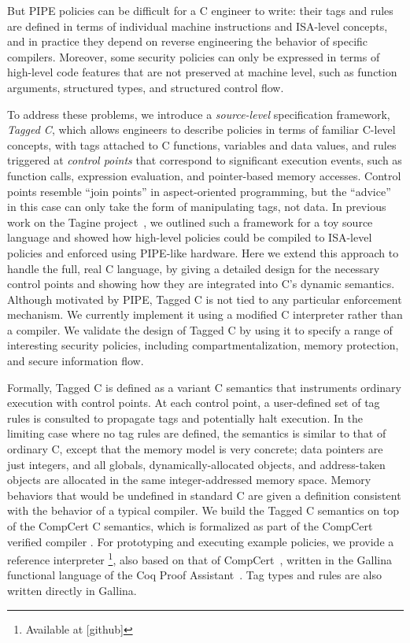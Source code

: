 \documentclass{llncs}
\begin{document}
But PIPE policies can be difficult for a C engineer to write: their tags and rules
are defined in terms of individual machine instructions and ISA-level
concepts, and in practice they depend on reverse engineering the behavior
of specific compilers. 
Moreover, some security policies can only be expressed in terms of high-level code
features that are not preserved at machine level, such as function
arguments, structured types, and structured control flow.

To address these problems, we introduce a \emph{source-level} specification framework, \emph{Tagged C},
which allows engineers to describe policies in terms of familiar C-level concepts, with tags attached
to C functions, variables and data values, and rules triggered at \emph{control points} that
correspond to significant execution events, such as function calls, expression evaluation,
and pointer-based memory accesses. 
Control points resemble ``join points'' in aspect-oriented programming, but the ``advice''
in this case can only take the form of manipulating tags, not data.
In previous work on the Tagine project~\cite{Chhak21:Tagine}, we outlined such a framework for a toy
source language and showed how high-level policies could be compiled to ISA-level policies and 
enforced using PIPE-like hardware.  Here we extend this approach to handle
the full, real C language, by giving a detailed design for the necessary control points and
showing how they are integrated into C's dynamic semantics. 
Although motivated by PIPE, Tagged C is not tied to any particular enforcement mechanism. 
We currently implement it using a modified C interpreter rather than a compiler.
We validate the design of Tagged C by using it to specify a range of interesting security policies,
including compartmentalization, memory protection, and secure information flow.


Formally, Tagged C is defined as a variant C semantics that instruments ordinary execution with
control points. At each control point, a user-defined set of tag rules is consulted to propagate
tags and potentially halt execution. In the limiting case where no tag rules are
defined, the semantics is similar to
that of ordinary C, except that the memory model is very concrete; 
data pointers are just integers, and all globals, dynamically-allocated objects,
and address-taken objects are allocated in the same integer-addressed memory space. Memory behaviors
that would be undefined in standard C are given a definition %
consistent with the behavior of a typical compiler.
We build the Tagged C semantics on top of the CompCert C semantics, which is formalized 
as part of the CompCert verified compiler \cite{Leroy09:CompCert,Leroy09:CompCertBackend}.
For prototyping and executing example policies,
we provide a reference interpreter \footnote{Available at [github]},
also based on that of CompCert~\cite[Ch. 4]{Leroy23:CompCertManual},
written in the Gallina functional language of the Coq Proof Assistant~\cite{coq}.
Tag types and rules are also written directly in Gallina. 
\end{document}
